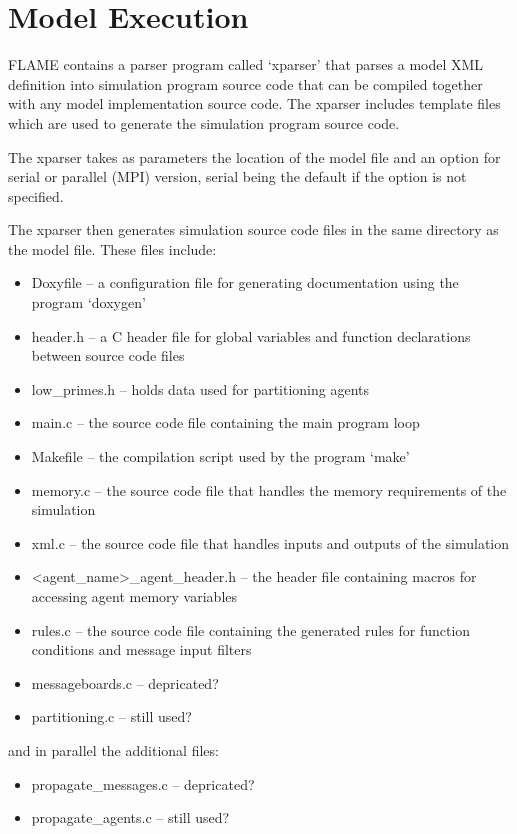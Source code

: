 \section{Model Execution}

FLAME contains a parser program called `xparser' that parses a model
XML definition into simulation program source code that can be compiled
together with any model implementation source code. The xparser includes
template files which are used to generate the simulation program source code.

The xparser takes as parameters the location of the model file and an option
for serial or parallel (MPI) version, serial being the default if the option is
not specified.

The xparser then generates simulation source code files in the same directory
as the model file. These files include:

\begin{itemize}
  \item Doxyfile -- a configuration file for generating documentation using
 the program `doxygen'
  \item header.h -- a C header file for global variables and function
  declarations between source code files
  \item low\_primes.h -- holds data used for partitioning agents
  \item main.c -- the source code file containing the main program loop
  \item Makefile -- the compilation script used by the program `make'
  \item memory.c -- the source code file that handles the memory requirements
  of the simulation
  \item xml.c -- the source code file that handles inputs and outputs of the
  simulation
  \item <agent\_name>\_agent\_header.h -- the header file containing macros for
  accessing agent memory variables
  \item rules.c -- the source code file containing the generated rules for
  function conditions and message input filters
  \item messageboards.c -- depricated?
  \item partitioning.c -- still used?
\end{itemize}

and in parallel the additional files:

\begin{itemize}
  \item propagate\_messages.c -- depricated?
  \item propagate\_agents.c -- still used?
\end{itemize}

